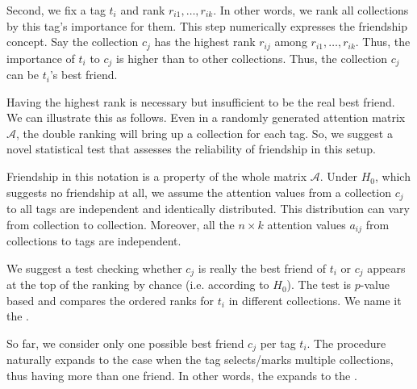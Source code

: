 \documentclass{llncs}
\begin{document}
Second, we fix a tag $t_i$ and rank $r_{i1}, \dots, r_{ik}$. In other words, we rank all collections by this tag's importance for them.
This step numerically expresses the friendship concept. Say the collection $c_j$ has the highest rank $r_{ij}$ among $r_{i1}, \dots, r_{ik}$. Thus, the importance of $t_i$ to $c_j$ is higher than to other collections. Thus, the collection $c_j$ can be $t_i$'s best friend.

Having the highest rank is necessary but insufficient to be the real best friend. We can illustrate this as follows. Even in a randomly generated attention matrix $\mathcal{A}$, the double ranking will bring up a collection for each tag. So, we suggest a novel statistical test that assesses the reliability of friendship in this setup.

Friendship in this notation is a property of the whole matrix $\mathcal{A}$.
Under $H_0$, which suggests no friendship at all, we assume the attention values from a collection $c_j$ to all tags are independent and identically distributed.
This distribution can vary from collection to collection. Moreover, all the $n \times k$ attention values $a_{ij}$ from collections to tags are independent.

We suggest a test checking whether $c_j$ is really the best friend of $t_i$ or $c_j$ appears at the top of the ranking by chance (i.e. according to $H_0$). The test is $p$-value based and compares the ordered ranks for $t_i$ in different collections. We name it the .


So far, we consider only one possible best friend $c_j$ per tag $t_i$. The procedure naturally expands to the case when the tag selects/marks multiple collections, thus having more than one friend. In other words, the  expands to the .
\end{document}
